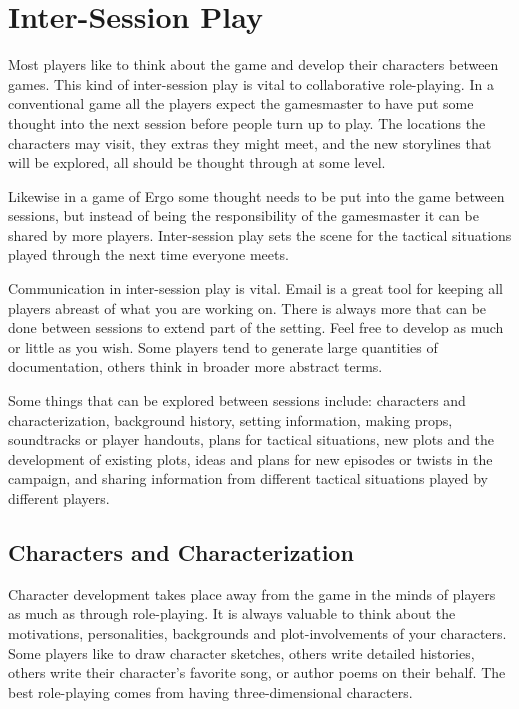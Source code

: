 \documentclass[twoside]{book}
\begin{document}
\section{Inter-Session Play}

Most players like to think about the game and develop their characters
between games. This kind of inter-session play is vital to
collaborative role-playing. In a conventional game all the players
expect the gamesmaster to have put some thought into the next session
before people turn up to play. The locations the characters may visit,
they extras they might meet, and the new storylines that will be
explored, all should be thought through at some level.

Likewise in a game of Ergo some thought needs to be put into the game
between sessions, but instead of being the responsibility of the
gamesmaster it can be shared by more players. Inter-session play sets
the scene for the tactical situations played through the next time
everyone meets.

Communication in inter-session play is vital. Email is a great tool
for keeping all players abreast of what you are working on. There is
always more that can be done between sessions to extend part of the
setting. Feel free to develop as much or little as you wish. Some
players tend to generate large quantities of documentation, others
think in broader more abstract terms.

Some things that can be explored between sessions include: characters
and characterization, background history, setting information, making
props, soundtracks or player handouts, plans for tactical situations,
new plots and the development of existing plots, ideas and plans for
new episodes or twists in the campaign, and sharing information from
different tactical situations played by different players.

\subsection{Characters and Characterization}

Character development takes place away from the game in the minds of
players as much as through role-playing. It is always valuable to
think about the motivations, personalities, backgrounds and
plot-involvements of your characters. Some players like to draw
character sketches, others write detailed histories, others write
their character's favorite song, or author poems on their behalf. The
best role-playing comes from having three-dimensional characters.
\end{document}
